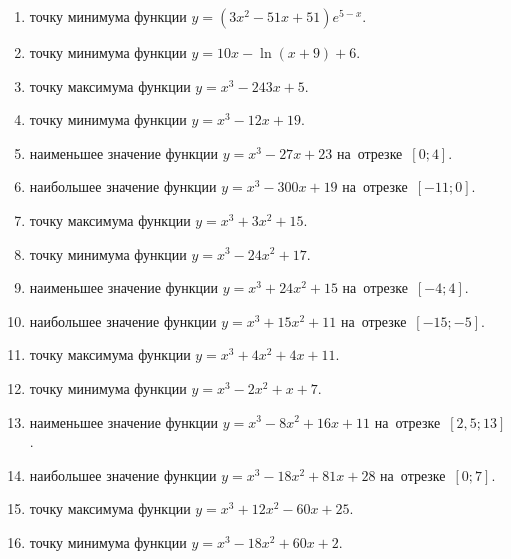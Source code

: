 \documentclass[a4paper,10pt]{article}
\begin{document}
\begin{enumerate}
\item {} точку минимума функции $y=\left(3x^2-51x+51\right){{e}^{5-x}}$.

\item {} точку минимума функции $y=10x-\ln \left(x+9\right)+6$.

\item {} точку максимума функции $y=x^3 -243x +5$.

\item {} точку минимума функции $y=x^3 -12x+19$.

\item {} наименьшее значение функции $y=x^3 -27x+23$ на~отрезке~$\left[0;4\right]$.

\item {} наибольшее значение функции $y=x^3 -300x+19$ на~отрезке~$\left[-11;0\right]$.

\item {} точку максимума функции $y=x^3 +3x^2+15$.

\item {} точку минимума функции $y=x^3 -24x^2+17$.

\item {} наименьшее значение функции $y=x^3 +24x^2+15$ на~отрезке~$\left[-4;4\right]$.

\item {} наибольшее значение функции $y=x^3 +15x^2+11$ на~отрезке~$\left[-15;-5\right]$.

\item {} точку максимума функции $y=x^3 +4x^2+4x+11$.

\item {} точку минимума функции $y=x^3 -2x^2+x+7$.

\item {} наименьшее значение функции $y=x^3 -8x^2+16x+11$ на~отрезке~$\left[2,5;13\right]$.

\item {} наибольшее значение функции $y=x^3 -18x^2+81x+28$ на~отрезке~$\left[0;7\right]$.

\item {} точку максимума функции $y=x^3 +12x^2-60x+25$.

\item {} точку минимума функции $y=x^3 -18x^2+60x+2$.


\end{enumerate}
\end{document}
